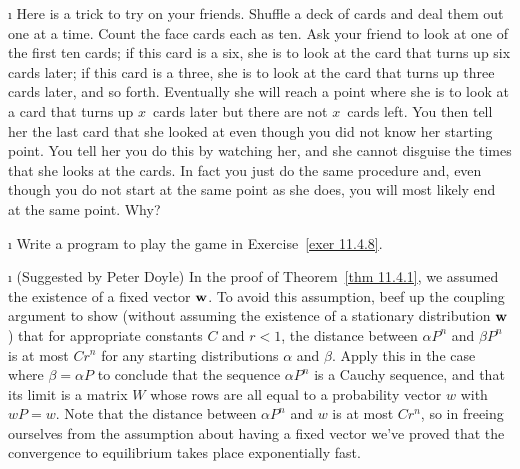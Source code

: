 \begin{LJSItem}
\i\label{exer 11.4.8} Here is a trick to try on your friends.  Shuffle a deck
of cards and deal them out one at a time.  Count the face cards each as ten. 
Ask
your friend to look at one of the first ten cards; if this card is a six, she
is
to look at the card that turns up six cards later; if this card is a three, she
is to look at the card that turns up three cards later, and so forth. 
Eventually she will reach a point where she is to look at a card that turns up
$x$~cards later but there are not $x$~cards left.  You then tell her the last
card that she looked at even though you did not know her starting point.  You
tell her you do this by watching her, and she cannot disguise the times that
she
looks at the cards.  In fact you just do the same procedure and, even though
you
do not start at the same point as she does, you will most likely end at the
same
point.  Why?

\i\label{exer 11.4.9} Write a program to play the game in Exercise~\ref{exer
11.4.8}.

\i\label{exer 11.4.10}  (Suggested by Peter Doyle) In the proof of Theorem~\ref{thm 11.4.1}, 
we assumed the existence of a fixed vector ${\mbox{\bf w}\/}$.  
To avoid this assumption, beef up the coupling argument to show (without assuming the existence
of a stationary distribution ${\mbox{\bf w}\/}$) that for appropriate constants
$C$ and $r<1$, the distance between $\alpha P^n$ and $\beta P^n$ is at most
$C r^n$ for any starting distributions $\alpha$ and $\beta$.
Apply this in the case where $\beta = \alpha P$ to
conclude that the sequence $\alpha P^n$ is a Cauchy sequence,
and that its limit is a matrix $W$ whose rows are all equal to a probability
vector $w$ with $wP=w$.  Note that the distance between $\alpha P^n$ and
$w$ is at most $C r^n$, so in freeing ourselves from the assumption about
having a fixed vector we've proved that the convergence to equilibrium
takes place exponentially fast.
\end{LJSItem}

